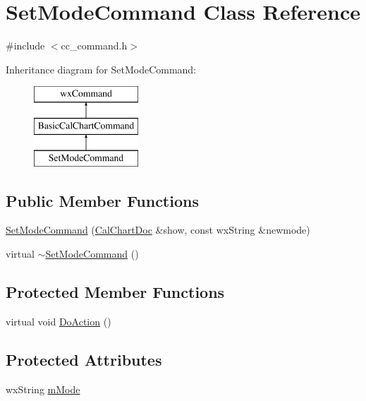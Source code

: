 \hypertarget{a00130}{\section{Set\-Mode\-Command Class Reference}
\label{a00130}
}


{\ttfamily \#include $<$cc\-\_\-command.\-h$>$}

Inheritance diagram for Set\-Mode\-Command\-:\begin{figure}[H]
\begin{center}
\leavevmode
\includegraphics[height=3.000000cm]{a00130}
\end{center}
\end{figure}
\subsection*{Public Member Functions}
\begin{DoxyCompactItemize}
\item 
\hyperlink{a00130_a2af4755d6ee7fc0cd55323803259466e}{Set\-Mode\-Command} (\hyperlink{a00020}{Cal\-Chart\-Doc} \&show, const wx\-String \&newmode)
\item 
virtual \hyperlink{a00130_a64b8af98e918d6aac5a6e33700fbee3d}{$\sim$\-Set\-Mode\-Command} ()
\end{DoxyCompactItemize}
\subsection*{Protected Member Functions}
\begin{DoxyCompactItemize}
\item 
virtual void \hyperlink{a00130_aa9a96b69185714f4acfa18ae5812cbcf}{Do\-Action} ()
\end{DoxyCompactItemize}
\subsection*{Protected Attributes}
\begin{DoxyCompactItemize}
\item 
wx\-String \hyperlink{a00130_a61a3c7ac103154dfaa9329160ccb9387}{m\-Mode}
\end{DoxyCompactItemize}



